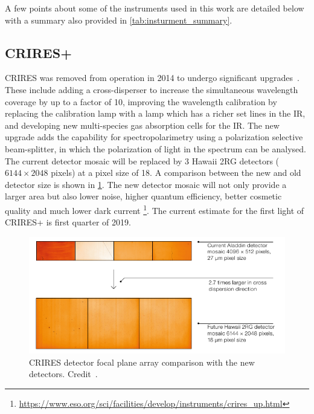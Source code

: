 A few points about some of the \nir{} instruments used in this work are detailed below with a summary also provided in \cref{tab:insturment_summary}.



\subsection{CRIRES+}
\label{subsec:criresplus}
CRIRES was removed from operation in 2014 to undergo significant upgrades~\citep{dorn_crires_2014}.
These include adding a cross-disperser to increase the simultaneous wavelength coverage by up to a factor of 10, improving the wavelength calibration by replacing the \thar{} calibration lamp with a \une{} lamp which has a richer set lines in the IR, and developing new multi-species gas absorption cells for the {IR}.
The new upgrade adds the capability for spectropolarimetry using a polarization selective beam-splitter, in which the polarization of light in the spectrum can be analysed.
The current detector mosaic will be replaced by 3 Hawaii 2RG detectors (\(6144\times 2048\) pixels) at a pixel size of 18\um{}.
A comparison between the new and old detector size is shown in \cref{fig:criresplus_detecotrs}.
The new detector mosaic will not only provide a larger area but also lower noise, higher quantum efficiency, better cosmetic quality and much lower dark current
\footnote{\href{https://www.eso.org/sci/facilities/develop/instruments/crires_up.html}{https://www.eso.org/sci/facilities/develop/instruments/crires\_up.html}}.
The current estimate for the first light of CRIRES+ is first quarter of 2019.

\begin{figure}
    \centering
    \includegraphics[width=0.6\linewidth]{figures/spectroscopy/criresplus_detectors.pdf}
    \caption[CRIRES/CRIRES+ detector focal plane arrays.]{CRIRES detector focal plane array comparison with the new detectors.
    Credit~\citet{dorn_crires_2014}.}
    \label{fig:criresplus_detecotrs}
\end{figure}

